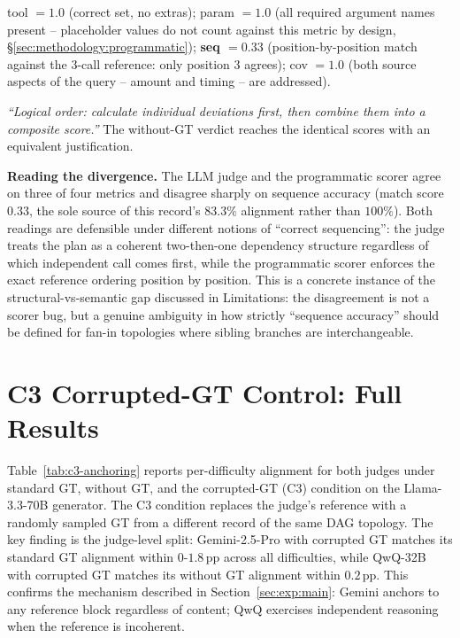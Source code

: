 \smallskip
\begin{gtbox}[Programmatic Judge \hfill tool $=1.0$, param $=1.0$, seq $=0.33$, cov $=1.0$]
\footnotesize
tool $=1.0$ (correct set, no extras); param $=1.0$ (all required argument names present -- placeholder values do not count against this metric by design, \S\ref{sec:methodology:programmatic}); \textbf{seq $=0.33$} (position-by-position match against the 3-call reference: only position 3 agrees); cov $=1.0$ (both source aspects of the query -- amount and timing -- are addressed).
\end{gtbox}

\smallskip
\begin{neutralbox}[LLM Judge: QwQ-32B, With GT \hfill tool $=1.0$, param $=1.0$, seq $=1.0$, cov $=1.0$]
\footnotesize
\emph{``Logical order: calculate individual deviations first, then combine them into a composite score.''} The without-GT verdict reaches the identical scores with an equivalent justification.
\end{neutralbox}

\smallskip
\noindent\textbf{Reading the divergence.} The LLM judge and the programmatic scorer agree on three of four metrics and disagree sharply on sequence accuracy (match score $0.33$, the sole source of this record's $83.3\%$ alignment rather than $100\%$). Both readings are defensible under different notions of ``correct sequencing'': the judge treats the plan as a coherent two-then-one dependency structure regardless of which independent call comes first, while the programmatic scorer enforces the exact reference ordering position by position. This is a concrete instance of the structural-vs-semantic gap discussed in Limitations: the disagreement is not a scorer bug, but a genuine ambiguity in how strictly ``sequence accuracy'' should be defined for fan-in topologies where sibling branches are interchangeable.

\section{C3 Corrupted-GT Control: Full Results}
\label{app:c3-table}

Table~\ref{tab:c3-anchoring} reports per-difficulty alignment for both judges under standard GT, without GT, and the corrupted-GT (C3) condition on the Llama-3.3-70B generator. The C3 condition replaces the judge's reference with a randomly sampled GT from a different record of the same DAG topology. The key finding is the judge-level split: Gemini-2.5-Pro with corrupted GT matches its standard GT alignment within $0$-$1.8$\,pp across all difficulties, while QwQ-32B with corrupted GT matches its without GT alignment within $0.2$\,pp. This confirms the mechanism described in Section~\ref{sec:exp:main}: Gemini anchors to any reference block regardless of content; QwQ exercises independent reasoning when the reference is incoherent.


